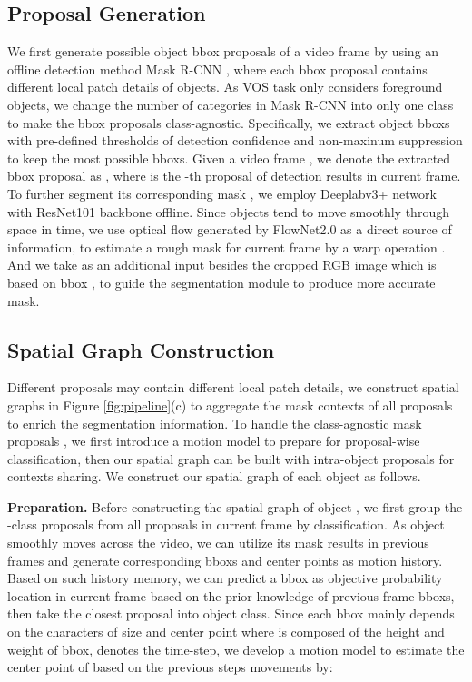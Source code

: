 \documentclass[letterpaper]{article} \usepackage{aaai21}  \usepackage{times}  \usepackage{helvet} \usepackage{courier}  \usepackage[hyphens]{url}  \usepackage{graphicx} \urlstyle{rm} \def\UrlFont{\rm}  \usepackage{graphicx}  \usepackage{natbib}  \usepackage{caption} \frenchspacing  \setlength{\pdfpagewidth}{8.5in}  \setlength{\pdfpageheight}{11in}  \usepackage{amsmath}
\begin{document}
\subsection{Proposal Generation}
We first generate possible object bbox proposals of a video frame by using an offline detection method Mask R-CNN \cite{he2017mask}, where each bbox proposal contains different local patch details of objects. As VOS task only considers foreground objects, we change the number of categories in Mask R-CNN into only one class to make the bbox proposals class-agnostic. Specifically, we extract object bboxs with pre-defined thresholds of detection confidence and non-maxinum suppression to keep the most possible bboxs. Given a video frame , we denote the extracted bbox proposal as , where  is the -th proposal of detection results in current frame.
To further segment its corresponding mask , we employ Deeplabv3+ \cite{chen2018encoder} network with ResNet101 \cite{he2016deep} backbone offline. 
Since objects tend to move smoothly through space in time, we use optical flow generated by FlowNet2.0 \cite{ilg2017flownet} as a direct source of information, to estimate a rough mask  for current frame by a warp operation \cite{khoreva2017lucid}. And we take  as an additional input besides the cropped RGB image  which is based on bbox , to guide the segmentation module to produce more accurate mask.

\subsection{Spatial Graph Construction}
Different proposals may contain different local patch details, we construct spatial graphs in Figure \ref{fig:pipeline}(c) to aggregate the mask contexts of all proposals to enrich the segmentation information. To handle the class-agnostic mask proposals , we first introduce a motion model to prepare for proposal-wise classification, then our spatial graph can be built with intra-object proposals for contexts sharing. We construct our spatial graph of each object as follows.

\noindent \textbf{Preparation.}
Before constructing the spatial graph of object , we first group the -class proposals from all proposals in current frame by classification.
As object smoothly moves across the video, we can utilize its mask results in previous frames and generate corresponding bboxs  and center points  as motion history. Based on such history memory, we can predict a bbox  as objective probability location in current frame based on the prior knowledge of previous frame bboxs, then take the closest proposal  into object  class.
Since each bbox mainly depends on the characters of size  and center point  where  is composed of the height and weight of bbox,  denotes the time-step, we develop a motion model to estimate the center point of  based on the previous  steps movements by:
\end{document}

